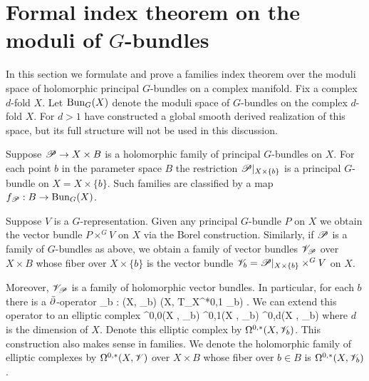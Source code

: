 \def\Bun{{\rm Bun}}

\section{Formal index theorem on the moduli of $G$-bundles}

%

In this section we formulate and prove a families index theorem over the moduli space of holomorphic principal $G$-bundles on a complex manifold. 
Fix a complex $d$-fold $X$. 
Let ${\rm Bun}_{G}(X)$ denote the moduli space of $G$-bundles on the complex $d$-fold $X$. 
For $d > 1$ \cite{FHK} have constructed a global smooth derived realization of this space, but its full structure will not be used in this discussion. 

Suppose $\mathscr P \to X \times B$ is a holomorphic family of principal $G$-bundles on $X$. 
For each point $b$ in the parameter space $B$ the restriction $\mathscr P|_{X \times \{b\}}$ is a principal $G$-bundle on $X = X \times \{b\}$. 
Such families are classified by a map $f_{\mathscr P} : B \to {\rm Bun}_G(X)$.

Suppose $V$ is a $G$-representation. 
Given any principal $G$-bundle $P$ on $X$ we obtain the vector bundle $P \times^G V$ on $X$ via the Borel construction. 
Similarly, if $\mathscr P$ is a family of $G$-bundles as above, we obtain a family of vector bundles $\mathscr V_\mathscr P$ over $X \times B$ whose fiber over $X \times \{b\}$ is the vector bundle $\mathscr V_b = \mathscr P|_{X \times \{b\}} \times^G V$ on $X$.

Moreover, $\mathscr V_\mathscr P$ is a family of holomorphic vector bundles. 
In particular, for each $b$ there is a $\Bar{\partial}$-operator
\ben
\dbar_b : \Gamma(X, \sV_b) \to \Gamma(X, T_X^{*0,1} \tensor \sV_b) .
\een
We can extend this operator to an elliptic complex 
\ben
\Omega^{0,0}(X , \sV_b)  \Omega^{0,1}(X , \sV_b)  \cdots {} \Omega^{0,d}(X , \sV_b)
\een
where $d$ is the dimension of $X$. 
Denote this elliptic complex by $\Omega^{0,*}(X , \mathscr V_b)$. 
This construction also makes sense in families.
We denote the holomorphic family of elliptic complexes by $\Omega^{0,*}(X , \mathscr V)$ over $X \times B$ whose fiber over $b \in B$ is $\Omega^{0,*}(X , \mathscr V_b)$.

